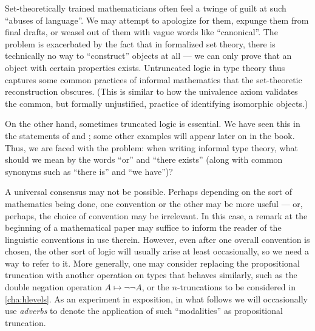 Set-theoretically trained mathematicians often feel a twinge of guilt at such ``abuses of language''.
We may attempt to apologize for them, expunge them from final drafts, or weasel out of them with vague words like ``canonical''.
The problem is exacerbated by the fact that in formalized set theory, there is technically no way to ``construct'' objects at all --- we can only prove that an object with certain properties exists.
Untruncated logic in type theory thus captures some common practices of informal mathematics that the set-theoretic reconstruction obscures.
(This is similar to how the univalence axiom validates the common, but formally unjustified, practice of identifying isomorphic objects.)

On the other hand, sometimes truncated logic is essential.
We have seen this in the statements of \LEM{} and \choice{}; some other examples will appear later on in the book.
Thus, we are faced with the problem: when writing informal type theory, what should we mean by the words ``or'' and ``there exists'' (along with common synonyms such as ``there is'' and ``we have'')?

A universal consensus may not be possible.
Perhaps depending on the sort of mathematics being done, one convention or the other may be more useful --- or, perhaps, the choice of convention may be irrelevant.
In this case, a remark at the beginning of a mathematical paper may suffice to inform the reader of the linguistic conventions in use therein.
However, even after one overall convention is chosen, the other sort of logic will usually arise at least occasionally, so we need a way to refer to it.
More generally, one may consider replacing the propositional truncation with another operation on types that behaves similarly, such as the double negation operation $A\mapsto \neg\neg A$, or the $n$-truncations to be considered in \cref{cha:hlevels}.
As an experiment in exposition,  in what follows we will occasionally use \emph{adverbs} to denote the application of such ``modalities'' as propositional truncation.

